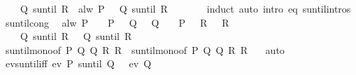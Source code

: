 \begin{isabellebody}
\ \ \ {\isacharasterisk}{\isacharcolon}\ {\isachardoublequoteopen}{\isacharparenleft}Q{}\ suntil\ R{}{\isacharparenright}\ {\isasymomega}{\isachardoublequoteclose}\ {\isachardoublequoteopen}alw\ P\ {\isasymomega}{\isachardoublequoteclose}\ \ {\isachardoublequoteopen}{\isacharparenleft}Q{}\ suntil\ R{}{\isacharparenright}\ {\isasymomega}{\isachardoublequoteclose}\isanewline
%
\isadelimproof
\ \ %
\endisadelimproof
%
\isatagproof
{}\isamarkupfalse%
\ {\isacharasterisk}\ \isamarkupfalse%
\ induct\ {\isacharparenleft}auto\ intro{\isacharcolon}\ eq\ suntil{\isachardot}intros{\isacharparenright}%
\endisatagproof
{\isafoldproof}%
%
\isadelimproof
\isanewline
%
\endisadelimproof
\isanewline
{}\isamarkupfalse%
\ suntil{\isacharunderscore}cong{\isacharcolon}\isanewline
\ \ {\isachardoublequoteopen}alw\ P\ {\isasymomega}\ {\isasymLongrightarrow}\ {\isacharparenleft}{\isasymAnd}{\isasymomega}{\isachardot}\ P\ {\isasymomega}\ {\isasymLongrightarrow}\ Q{}\ {\isasymomega}\ {\isasymlongleftrightarrow}\ Q{}\ {\isasymomega}{\isacharparenright}\ {\isasymLongrightarrow}\ {\isacharparenleft}{\isasymAnd}{\isasymomega}{\isachardot}\ P\ {\isasymomega}\ {\isasymLongrightarrow}\ R{}\ {\isasymomega}\ {\isasymlongleftrightarrow}\ R{}\ {\isasymomega}{\isacharparenright}\ {\isasymLongrightarrow}\isanewline
\ \ \ \ {\isacharparenleft}Q{}\ suntil\ R{}{\isacharparenright}\ {\isasymomega}\ {\isasymlongleftrightarrow}\ {\isacharparenleft}Q{}\ suntil\ R{}{\isacharparenright}\ {\isasymomega}{\isachardoublequoteclose}\isanewline
%
\isadelimproof
\ \ %
\endisadelimproof
%
\isatagproof
{}\isamarkupfalse%
\ suntil{\isacharunderscore}mono{\isacharbrackleft}of\ P\ Q{}\ Q{}\ R{}\ R{}\ {\isasymomega}{\isacharbrackright}\ suntil{\isacharunderscore}mono{\isacharbrackleft}of\ P\ Q{}\ Q{}\ R{}\ R{}\ {\isasymomega}{\isacharbrackright}\ \isamarkupfalse%
\ auto%
\endisatagproof
{\isafoldproof}%
%
\isadelimproof
\isanewline
%
\endisadelimproof
\isanewline
{}\isamarkupfalse%
\ ev{\isacharunderscore}suntil{\isacharunderscore}iff{\isacharcolon}\ {\isachardoublequoteopen}ev\ {\isacharparenleft}P\ suntil\ Q{\isacharparenright}\ {\isasymomega}\ {\isasymlongleftrightarrow}\ ev\ Q\ {\isasymomega}{\isachardoublequoteclose}\isanewline
%
\isadelimproof

\end{isabellebody}

